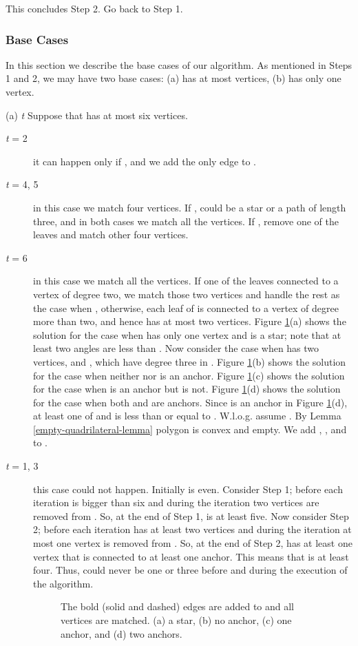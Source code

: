 \documentclass[11pt,a4paper]{article}
\begin{document}
This concludes Step 2. Go back to Step 1.

\subsubsection{Base Cases}
\label{base-cases}

In this section we describe the base cases of our algorithm. As mentioned in Steps 1 and 2, we may have two base cases: (a)  has at most  vertices, (b)  has only one vertex.

\begin{paragraph}{(a) {\em t}} Suppose that  has at most six vertices.
\begin{description}
  \item [{\em t} = 2] it can happen only if , and we add the only edge to .
  \item [{\em t} = 4, 5] in this case we match four vertices. If ,  could be a star or a path of length three, and in both cases we match all the vertices. If , remove one of the leaves and match other four vertices.
  \item [{\em t} = 6] in this case we match all the vertices. If one of the leaves connected to a vertex of degree two, we match those two vertices and handle the rest as the case when , otherwise, each leaf of  is connected to a vertex of degree more than two, and hence  has at most two vertices. Figure \ref{n-small}(a) shows the solution for the case when  has only one vertex and  is a star; note that at least two angles are less than . 
  Now consider the case when  has two vertices,  and , which have degree three in . Figure \ref{n-small}(b) shows the solution for the case when neither  nor  is an anchor. 
  Figure \ref{n-small}(c) shows the solution for the case when  is an anchor but  is not.
  Figure \ref{n-small}(d) shows the solution for the case when both  and  are anchors. Since  is an anchor in Figure \ref{n-small}(d), at least one of  and  is less than or equal to . W.l.o.g. assume . By Lemma \ref{empty-quadrilateral-lemma} polygon  is convex and empty. We add , , and  to .

  \item [{\em t} = 1, 3] this case could not happen. Initially  is even. Consider Step 1; before each iteration  is bigger than six and during the iteration two vertices are removed from . So, at the end of Step 1,  is at least five. Now consider Step 2; before each iteration  has at least two vertices and during the iteration at most one vertex is removed from . So, at the end of Step 2,  has at least one vertex that is connected to at least one anchor. This means that  is at least four. Thus,  could never be one or three before and during the execution of the algorithm.

\begin{figure}[ht]
  \centering
\setlength{\tabcolsep}{0in}
  
  \caption{The bold (solid and dashed) edges are added to  and all vertices are matched. (a) a star, (b) no anchor, (c) one anchor, and (d) two anchors.}
\label{n-small}
\end{figure} 

\end{description}
\end{paragraph}
\end{document}
